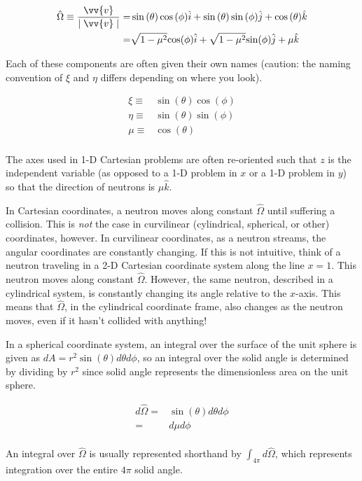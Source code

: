 \documentclass[10pt]{article}
\newcommand{\beqa}{\begin{equation}\begin{aligned}}
\newcommand{\eeqa}{\end{aligned}\end{equation}}
\newcommand{\hO}{\hat{\Omega}}
\begin{document}
\begin{flushleft}
\beqa
\label{eq:OmegaCartesian}
\hO  \equiv \frac{\vv{v}}{\mid \vv{v}\mid} =& \sin{(\theta)}\cos{(\phi)}\hat{i} + \sin{(\theta)}\sin{(\phi)}\hat{j} + \cos{(\theta)}\hat{k}\\
=& \sqrt{1-\mu^2}\textrm{cos}(\phi)\hat{i} + \sqrt{1-\mu^2}\textrm{sin}(\phi)\hat{j} + \mu\hat{k}\\
\eeqa

Each of these components are often given their own names (caution: the naming convention of \(\xi\) and \(\eta\) differs depending on where you look). 

\beqa
\label{eq:OmegaComponentsCartesian}
 \xi \equiv &\sin{(\theta)}\cos{(\phi)}\\
 \eta \equiv &\sin{(\theta)}\sin{(\phi)}\\
 \mu \equiv &\cos{(\theta)}\\
\eeqa

The axes used in 1-D Cartesian problems are often re-oriented such that \(z\) is the independent variable (as opposed to a 1-D problem in \(x\) or a 1-D problem in \(y\)) so that the direction of neutrons is \(\mu\hat{k}\).

In Cartesian coordinates, a neutron moves along constant \(\hO\) until suffering a collision. This is {\it not} the case in curvilinear (cylindrical, spherical, or other) coordinates, however. In curvilinear coordinates, as a neutron streams, the angular coordinates are constantly changing. If this is not intuitive, think of a neutron traveling in a 2-D Cartesian coordinate system along the line \(x = 1\). This neutron moves along constant \(\hO\). However, the same neutron, described in a cylindrical system, is constantly changing its angle relative to the \(x\)-axis. This means that \(\hO\), in the cylindrical coordinate frame, also changes as the neutron moves, even if it hasn't collided with anything!

In a spherical coordinate system, an integral over the surface of the unit sphere is given as \(dA=r^2\sin{(\theta)}d\theta d\phi\), so an integral over the solid angle is determined by dividing by \(r^2\) since solid angle represents the dimensionless area on the unit sphere.

\beqa
\label{eq:DifferentialOmega}
d\hO  =&\sin{(\theta)}d\theta d\phi\\
=&d\mu d\phi\\
\eeqa

An integral over \(\hO\) is usually represented shorthand by \(\int_{4\pi}^{ } d\hO\), which represents integration over the entire \(4\pi\) solid angle.


\end{flushleft}
\end{document}

